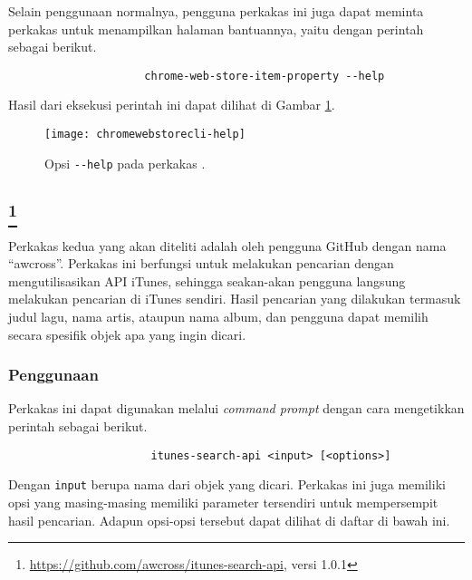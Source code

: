\noindent
Selain penggunaan normalnya, pengguna perkakas ini juga dapat meminta perkakas untuk menampilkan halaman bantuannya, yaitu dengan perintah sebagai berikut.
\vspace{-0.025em} %
\begin{verbatim}
                     chrome-web-store-item-property --help
\end{verbatim}
\vspace{-0.025em} %
\noindent
Hasil dari eksekusi perintah ini dapat dilihat di Gambar \ref{fig:similarapps-chromewebstorecli-help}.

\begin{figure}[ht]
    \centering
    \texttt{[image: chromewebstorecli-help]}
    \caption[Opsi bantuan penggunaan pada perkakas \chromewebstorecli]{Opsi \texttt{-{}-help} pada perkakas \chromewebstorecli.}
    \label{fig:similarapps-chromewebstorecli-help}
\end{figure}

\subsection[\itunesapi]{\itunesapi\footnote{\href{https://github.com/awcross/itunes-search-api}{https://github.com/awcross/itunes-search-api}, versi 1.0.1}}
\label{sec:similarapps-itunesapi}

Perkakas kedua yang akan diteliti adalah \itunesapi\xspace oleh pengguna GitHub dengan nama ``awcross''. Perkakas ini berfungsi untuk melakukan pencarian dengan mengutilisasikan API iTunes, sehingga seakan-akan pengguna langsung melakukan pencarian di iTunes sendiri. Hasil pencarian yang dilakukan termasuk judul lagu, nama artis, ataupun nama album, dan pengguna dapat memilih secara spesifik objek apa yang ingin dicari.

\subsubsection{Penggunaan}
\label{sec:similarapps-itunesapi-usage}

Perkakas ini dapat digunakan melalui \textit{command prompt} dengan cara mengetikkan perintah sebagai berikut.

\begin{verbatim}
                      itunes-search-api <input> [<options>]
\end{verbatim}

Dengan \verb|input| berupa nama dari objek yang dicari. Perkakas ini juga memiliki opsi yang masing-masing memiliki parameter tersendiri untuk mempersempit hasil pencarian. Adapun opsi-opsi tersebut dapat dilihat di daftar di bawah ini.

